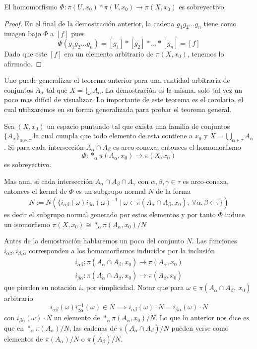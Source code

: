 \begin{corolario}\label{cor:sobre-van}
  El homomorfismo \(\Phi : \pi (U, x_0) * \pi (V, x_0) \to \pi (X,
  x_0)\) es sobreyectivo.
\end{corolario}
\begin{proof}
  En el final de la demostración anterior, la cadena \(g_1 g_2 \dots
  g_n\) tiene como imagen bajo \(\Phi\) a \([f]\) pues
  \[ \Phi \left( g_1 g_2 ... g_n \right) = [g_1] * [g_2] * ... *
    [g_n] = [f] \]
  Dado que este \([f]\) era un elemento arbitrario de \(\pi \left( X,
    x_0 \right)\), tenemos lo afirmado.
\end{proof}
Uno puede generalizar el teorema anterior para una cantidad arbitraria
de conjuntos \(A_\alpha\) tal que \(X = \bigcup A_\alpha\). La
demostración es la misma, solo tal vez un poco mas difícil de
visualizar. Lo importante de este teorema es el corolario, el cual
utilizaremos en su forma generalizada para probar el teorema general.

\begin{teorema}[\vank]
  Sea \((X, x_0)\) un espacio puntuado tal que exista una familia de
  conjuntos \(\{A_\alpha\}_{\alpha \in \tau}\) la cual cumpla que todo
  elemento de esta contiene a \(x_0\) y \( X = \bigcup_{\alpha \in \tau} A_\alpha\). Si para cada
  intersección \(A_\alpha \cap A_\beta\) es arco-conexa, entonces el
  homomorfismo
  \[ \Phi : *_\alpha \pi (A_\alpha, x_0) \to \pi (X, x_0) \]
  es sobreyectivo.

  Mas aun, si cada intersección \(A_\alpha \cap A_\beta
  \cap A_\gamma\) con \( \alpha, \beta, \gamma \in \tau\) es arco-conexa,
  entonces el kernel de \(\Phi\) es un subgrupo normal \(N\) de la forma
  \[
    N := N \left( \{ i_{\alpha \beta} (\omega) i_{\beta \alpha} (\omega)^{-1}
    \mid \omega \in \pi \left( A_\alpha \cap A_\beta, x_0 \right),\
    \forall \alpha ,\beta \in \tau \} \right)
  \]
  es decir el subgrupo normal generado por estos elementos y por tanto
  \(\Phi\) induce un isomorfismo \(\pi (X, x_0) \cong *_\alpha \pi
  (A_\alpha, x_0) / N \)
\end{teorema}
Antes de la demostración hablaremos un poco del conjunto \(N\). Las
funciones \(i_{\alpha \beta}, i_{\beta, \alpha}\) corresponden a los
homomorfismos inducidos por la inclusión
\begin{gather*}
  i_{\alpha \beta} : \pi (A_\alpha \cap A_\beta , x_0 ) \longrightarrow \pi (A_\alpha, x_0) \\
  i_{\beta \alpha} : \pi (A_\alpha \cap A_\beta , x_0 ) \longrightarrow \pi (A_\beta, x_0)
\end{gather*}
que pierden su notación \(i_*\) por simplicidad. Notar que
para \(\omega \in \pi (A_\alpha \cap A_\beta ,\ x_0)\) arbitrario
\[ i_{\alpha \beta} (\omega) i_{\beta \alpha}^{-1} (\omega) \in N
  \implies i_{\alpha \beta} (\omega) \cdot N = i_{\beta
\alpha} (\omega) \cdot N \]
con \(i_{\beta \alpha} (\omega) \cdot N\) un elemento de \(*_\alpha \pi
(A_\alpha , x_0) / N\). Lo que lo anterior nos dice es que en \(*_\alpha
\pi (A_\alpha) / N\), las cadenas de \(\pi (A_\alpha \cap A_\beta) / N\)
pueden verse como elementos de \(\pi(A_\alpha) / N\) o \(\pi (A_\beta) /
N\).

